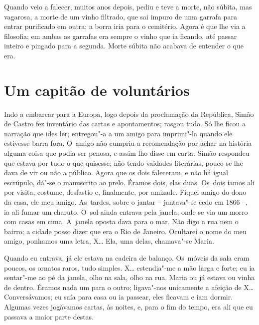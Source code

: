 Quando veio a falecer, muitos anos depois, pediu e teve a morte, não
súbita, mas vagarosa, a morte de um vinho filtrado, que sai impuro de
uma garrafa para entrar purificado em outra; a borra iria para o
cemitério. Agora é que lhe via a filosofia; em ambas as garrafas era
sempre o vinho que ia ficando, até passar inteiro e pingado para a
segunda. Morte súbita não acabava de entender o que era.

\chapter{Um capitão de voluntários}

Indo a embarcar para a Europa, logo depois da proclamação da República,
Simão de Castro fez inventário das cartas e apontamentos; rasgou tudo.
Só lhe ficou a narração que ides ler; entregou"-a a um amigo para
imprimi"-la quando ele estivesse barra fora. O~amigo não cumpriu a
recomendação por achar na história alguma coisa que podia ser penosa, e
assim lho disse em carta. Simão respondeu que estava por tudo o que
quisesse; não tendo vaidades literárias, pouco se lhe dava de vir ou não
a público. Agora que os dois faleceram, e não há igual escrúpulo, dá"-se
o manuscrito ao prelo. Éramos dois, elas duas. Os~dois íamos ali por
visita, costume, desfastio e, finalmente, por amizade. Fiquei amigo do
dono da casa, ele meu amigo. As~tardes, sobre o jantar -- jantava"-se
cedo em 1866 --, ia ali fumar um charuto. O~sol ainda entrava pela
janela, onde se via um morro com casas em cima. A~janela oposta dava
para o mar. Não digo a rua nem o bairro; a cidade posso dizer que era o
Rio de Janeiro. Ocultarei o nome do meu amigo, ponhamos uma letra, X\ldots{}
Ela, uma delas, chamava"-se Maria.

Quando eu entrava, já ele estava na cadeira de balanço. Os~móveis da
sala eram poucos, os ornatos raros, tudo simples. X\ldots{} estendia"-me a mão
larga e forte; eu ia sentar"-me ao pé da janela, olho na sala, olho na
rua. Maria ou já estava ou vinha de dentro. Éramos nada um para o outro;
ligava"-nos unicamente a afeição de X\ldots{} Conversávamos; eu saía para casa
ou ia passear, eles ficavam e iam dormir. Algumas vezes jogávamos
cartas, às noites, e, para o fim do tempo, era ali que eu passava a
maior parte destas.

